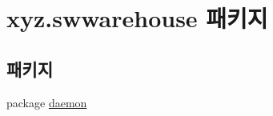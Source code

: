 \hypertarget{namespacexyz_1_1swwarehouse}{\section{xyz.\+swwarehouse 패키지}
\label{namespacexyz_1_1swwarehouse}
}
\subsection*{패키지}
\begin{DoxyCompactItemize}
\item 
package \hyperlink{namespacexyz_1_1swwarehouse_1_1daemon}{daemon}
\end{DoxyCompactItemize}
